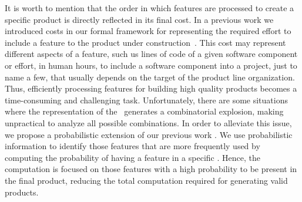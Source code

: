 It is worth to mention that the order in which features are processed to create a specific product is directly reflected in its final cost. In a previous work we introduced costs in our formal framework for representing the required effort to include a feature to the product under construction~\cite{cln16}. This cost may represent different aspects of a feature, such us lines of code of a given software component or effort, in human hours, to include a software component into a project, just to name a few, that usually depends on the target of the product line organization. Thus, efficiently processing features for building high quality products becomes a time-consuming and challenging task. Unfortunately, there are some situations where the representation of the \SPL\ generates a combinatorial explosion, making unpractical to analyze all possible combinations.
%
In order to alleviate this issue, we propose a probabilistic extension of our previous work \fodaPA. We use probabilistic information to identify those features that are more frequently used by computing the probability of having a feature in a specific \SPL. Hence, the computation is focused on those features with a high probability to be present in the final product, reducing the total computation required for generating valid products.




